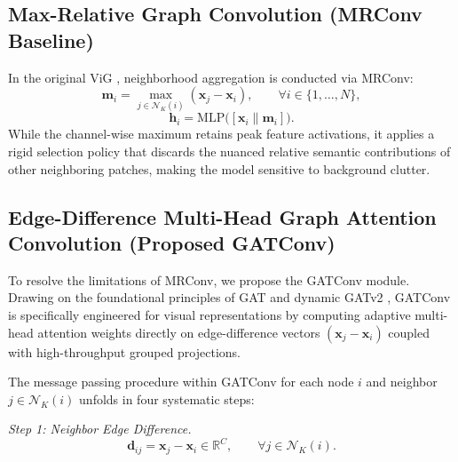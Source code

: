 \documentclass[]{interact}
\theoremstyle{plain}
\theoremstyle{definition}
\theoremstyle{remark}
\begin{document}
\subsection{Max-Relative Graph Convolution (MRConv Baseline)}
\label{sec:mrconv_baseline}

In the original ViG \citep{han2022vision}, neighborhood aggregation is conducted via MRConv:
\begin{equation}
\mathbf{m}_i = \max_{j \in \mathcal{N}_K(i)} (\mathbf{x}_j - \mathbf{x}_i), \qquad \forall i \in \{1, \dots, N\},
\end{equation}
\begin{equation}
\mathbf{h}_i = \text{MLP}\big([\mathbf{x}_i \parallel \mathbf{m}_i]\big).
\end{equation}
While the channel-wise maximum retains peak feature activations, it applies a rigid selection policy that discards the nuanced relative semantic contributions of other neighboring patches, making the model sensitive to background clutter.

\subsection{Edge-Difference Multi-Head Graph Attention Convolution (Proposed GATConv)}
\label{sec:gatconv}

To resolve the limitations of MRConv, we propose the GATConv module. Drawing on the foundational principles of GAT \citep{velickovic2018graph} and dynamic GATv2 \citep{brody2022gat}, GATConv is specifically engineered for visual representations by computing adaptive multi-head attention weights directly on edge-difference vectors $(\mathbf{x}_j - \mathbf{x}_i)$ coupled with high-throughput grouped projections.

The message passing procedure within GATConv for each node $i$ and neighbor $j \in \mathcal{N}_K(i)$ unfolds in four systematic steps:

\textit{Step 1: Neighbor Edge Difference.}
\begin{equation}
\mathbf{d}_{ij} = \mathbf{x}_j - \mathbf{x}_i \in \mathbb{R}^{C}, \qquad \forall j \in \mathcal{N}_K(i).
\label{eq:diff}
\end{equation}
\end{document}
